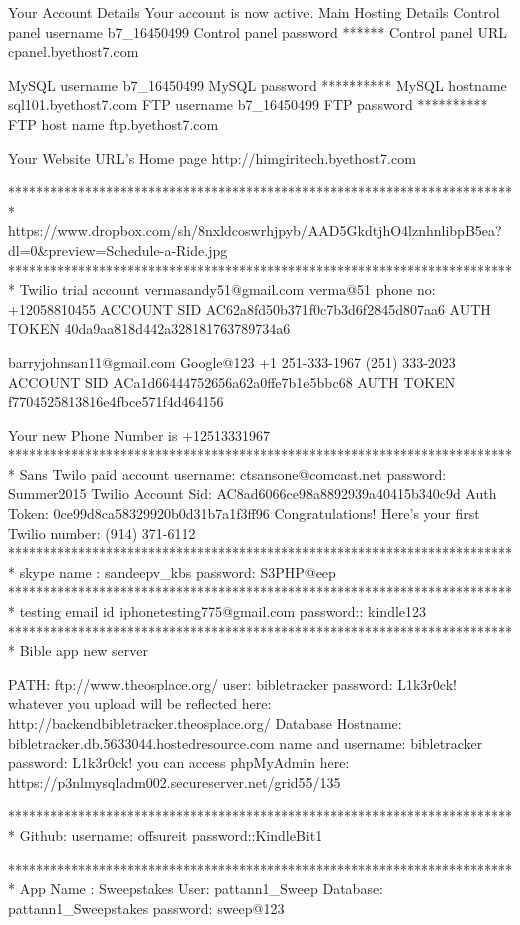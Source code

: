 Your Account Details
Your account is now active.
Main Hosting Details
Control panel username
	b7_16450499
Control panel password 	******
Control panel URL
	cpanel.byethost7.com

MySQL username
	b7_16450499
MySQL password
	**********
MySQL hostname
	sql101.byethost7.com
FTP username
	b7_16450499
FTP password
	**********
FTP host name 	ftp.byethost7.com

	
Your Website URL's
Home page
	http://himgiritech.byethost7.com

*************************************************************************
https://www.dropbox.com/sh/8nxldcoswrhjpyb/AAD5GkdtjhO4lznhnlibpB5ea?dl=0&preview=Schedule-a-Ride.jpg 
*************************************************************************
Twilio trial account
vermasandy51@gmail.com
verma@51
phone no: +12058810455
ACCOUNT SID
AC62a8fd50b371f0c7b3d6f2845d807aa6
AUTH TOKEN
40da9aa818d442a328181763789734a6

barryjohnsan11@gmail.com
Google@123
+1 251-333-1967 
(251) 333-2023
ACCOUNT SID
ACa1d66444752656a62a0ffe7b1e5bbc68
AUTH TOKEN
f7704525813816e4fbce571f4d464156

Your new Phone Number is +12513331967
*************************************************************************
Sans Twilo paid account
username: ctsansone@comcast.net
password: Summer2015
Twilio
Account Sid: AC8ad6066ce98a8892939a40415b340c9d
Auth Token: 0ce99d8ca58329920b0d31b7a1f3ff96
Congratulations! Here's your first Twilio number: (914) 371-6112
*************************************************************************
skype name : sandeepv_kbs
password: S3PHP@eep
*************************************************************************
testing email id
iphonetesting775@gmail.com
password:: kindle123
*************************************************************************
Bible app new server

PATH: ftp://www.theosplace.org/
user: bibletracker
password: L1k3r0ck!
whatever you upload will be reflected here: http://backendbibletracker.theosplace.org/
Database
Hostname: bibletracker.db.5633044.hostedresource.com
name and username: bibletracker
password: L1k3r0ck!
you can access phpMyAdmin here: https://p3nlmysqladm002.secureserver.net/grid55/135

*************************************************************************
Github:
username: offsureit
password::KindleBit1

*************************************************************************
App Name : Sweepstakes
User: pattann1_Sweep
Database: pattann1_Sweepstakes 
password: sweep@123

